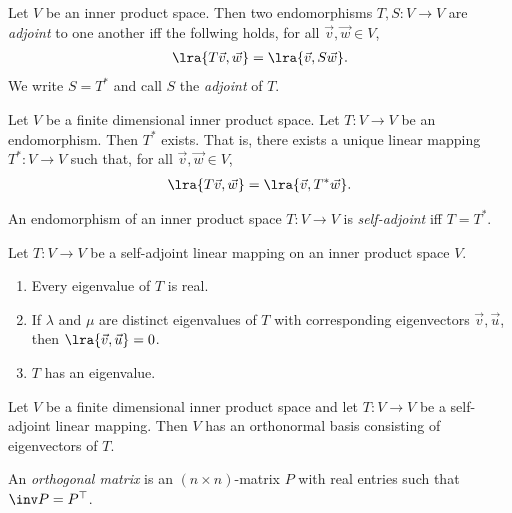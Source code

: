 \documentclass{article}
\begin{document}
\begin{definition}
	Let $V$ be an inner product space. Then two endomorphisms $T,S:V\to V$ are \emph{adjoint}
	to one another iff the follwing holds, for all $\vec v, \vec w\in V$,
	\begin{align*}
		\lra{T\vec v,\vec w}=\lra{\vec v, S\vec w}.
	\end{align*}
	We write $S=T^*$ and call $S$ the \emph{adjoint} of $T$.
\end{definition}

\begin{theorem}[Theorem 5.3.4]
	Let $V$ be a finite dimensional inner product space. Let $T:V\to V$ be an endomorphism. Then $T^*$
	exists. That is, there exists a unique linear mapping $T^*:V\to V$ such that, for all $\vec v,\vec w\in V$,
	\begin{align*}
		\lra{T\vec v,\vec w}=\lra{\vec v, T^*\vec w}.
	\end{align*}
\end{theorem}

\begin{definition}
	An endomorphism of an inner product space $T:V\to V$ is \emph{self-adjoint} iff $T=T^*$.
\end{definition}

\begin{theorem}[Theorem 5.3.7]
	Let $T:V\to V$ be a self-adjoint linear mapping on an inner product space $V$.
	\begin{enumerate}
		\item Every eigenvalue of $T$ is real.
		\item If $\lambda$ and $\mu$ are distinct eigenvalues of $T$ with corresponding eigenvectors
		      $\vec v,\vec u$, then $\lra{\vec v,\vec u}=0$.
		\item $T$ has an eigenvalue.
	\end{enumerate}
\end{theorem}

\begin{theorem}
	Let $V$ be a finite dimensional inner product space and let $T:V\to V$ be a self-adjoint linear
	mapping. Then $V$ has an orthonormal basis consisting of eigenvectors of $T$.
\end{theorem}

\begin{definition}
	An \emph{orthogonal matrix} is an $(n\times n)$-matrix $P$ with real entries such that $\inv P=P^\top$.
\end{definition}
\end{document}
